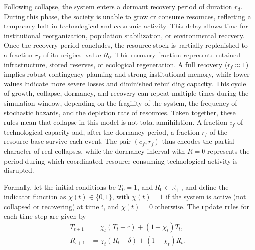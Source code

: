 Following collapse, the system enters a dormant recovery period of duration \(r_{d}\). During this phase, the society is unable to grow or consume resources, reflecting a temporary halt in technological and economic activity. This delay allows time for institutional reorganization, population stabilization, or environmental recovery. Once the recovery period concludes, the resource stock is partially replenished to a fraction \(r_{f}\) of its original value \(R_{0}\). This recovery fraction represents retained infrastructure, stored reserves, or ecological regeneration. A full recovery (\(r_{f} \approx 1\)) implies robust contingency planning and strong institutional memory, while lower values indicate more severe losses and diminished rebuilding capacity. This cycle of growth, collapse, dormancy, and recovery can repeat multiple times during the simulation window, depending on the fragility of the system, the frequency of stochastic hazards, and the depletion rate of resources. Taken together, these rules mean that collapse in this model is not total annihilation. A fraction $c_f$ of technological capacity and, after the dormancy period, a fraction $r_f$ of the resource base survive each event. The pair $(c_f, r_f)$ thus encodes the partial character of real collapses, while the dormancy interval with $R=0$ represents the period during which coordinated, resource-consuming technological activity is disrupted.

Formally, let the initial conditions be \(T_{0} = 1\), and \(R_{0} \in {\mathbb{R}}_{+}\ \), and define the indicator function as \(\chi(t) \in \{ 0,1\}\), with \(\chi(t) = 1\) if the system is active (not collapsed or recovering) at time \(t\), and \(\chi(t) = 0\) otherwise. The update rules for each time step are given by
\begin{equation}
\begin{aligned}
T_{t+1} &= \chi_t \left( T_t + r \right) + \left(1 - \chi_t\right) T_t ,\\
R_{t+1} &= \chi_t \left( R_t - \delta \right) + \left(1 - \chi_t\right) R_t .
\end{aligned}
\label{eq:update}
\end{equation}

